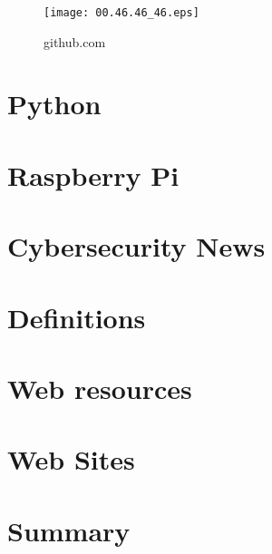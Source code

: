\documentclass[7x9]{times}
\begin{document}

\begin{center}
	\begin{figure}[ht]
		\texttt{[image: 00.46.46\_46.eps]}
		\caption{github.com}
	\end{figure}
\end{center}



\section{Python}
\section{Raspberry Pi}

\section{Cybersecurity News}

\section{Definitions}

\section{Web resources}


\section{Web Sites}

\section{Summary}
\end{document}
